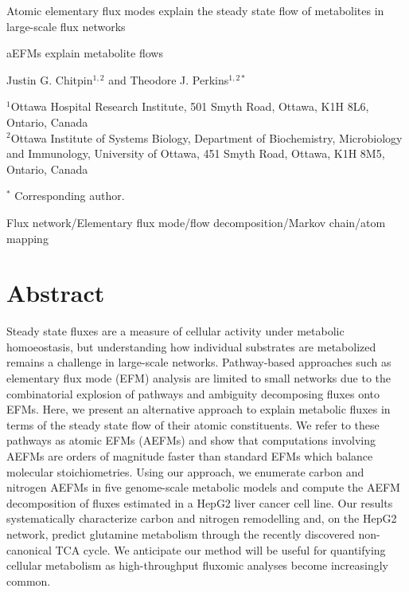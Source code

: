 \documentclass[12pt]{article}
\begin{document}
\begin{titlepage}
    \begin{center}
        \vspace*{1cm}

        Atomic elementary flux modes explain the steady state flow of
        metabolites in large-scale flux networks

        \vspace{1.0cm}
        aEFMs explain metabolite flows
            
        \vspace{1.0cm}

        Justin G. Chitpin$^{1,2}$ and Theodore J. Perkins$^{1,2*}$

        \vspace{1.0cm}

        $^1$Ottawa Hospital Research Institute, 501 Smyth Road, Ottawa, K1H 8L6, Ontario, Canada\\
        $^2$Ottawa Institute of Systems Biology, Department of Biochemistry, Microbiology and Immunology, University of Ottawa, 451 Smyth Road, Ottawa, K1H 8M5, Ontario, Canada
           
        \vspace{0.5cm}

        $^*$ Corresponding author.

        \vspace{1.0cm}
     
        Flux network/Elementary flux mode/flow decomposition/Markov chain/atom mapping
            
   \end{center}
\end{titlepage}

\clearpage

\section*{Abstract} %

Steady state fluxes are a measure of cellular activity under metabolic
homoeostasis, but understanding how individual substrates are metabolized
remains a challenge in large-scale networks. Pathway-based approaches such
as elementary flux mode (EFM) analysis are limited to small networks due
to the combinatorial explosion of pathways and ambiguity decomposing
fluxes onto EFMs. Here, we present an alternative approach to explain
metabolic fluxes in terms of the steady state flow of their atomic 
constituents. We refer to these pathways as atomic EFMs (AEFMs) and show
that computations involving AEFMs are orders of magnitude faster than
standard EFMs which balance molecular stoichiometries. Using our approach,
we enumerate carbon and nitrogen AEFMs in five genome-scale metabolic
models and compute the AEFM decomposition of fluxes estimated in a HepG2
liver cancer cell line. Our results systematically characterize carbon and
nitrogen remodelling and, on the HepG2 network, predict glutamine
metabolism through the recently discovered non-canonical TCA cycle. We
anticipate our method will be useful for quantifying cellular metabolism
as high-throughput fluxomic analyses become increasingly common.
\end{document}
